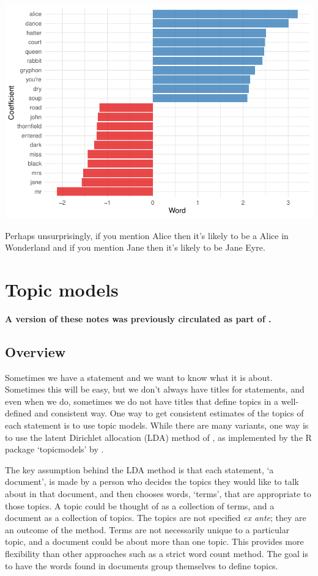 \documentclass[
]{book}
\begin{document}
\includegraphics{telling_stories_with_data_files/figure-latex/unnamed-chunk-412-1.pdf}

Perhaps unsurprisingly, if you mention Alice then it's likely to be a Alice in Wonderland and if you mention Jane then it's likely to be Jane Eyre.

\hypertarget{topic-models}{%
\section{Topic models}\label{topic-models}}

\textbf{A version of these notes was previously circulated as part of \citet{Alexander2020}.}

\hypertarget{overview-1}{%
\subsection{Overview}\label{overview-1}}

Sometimes we have a statement and we want to know what it is about. Sometimes this will be easy, but we don't always have titles for statements, and even when we do, sometimes we do not have titles that define topics in a well-defined and consistent way. One way to get consistent estimates of the topics of each statement is to use topic models. While there are many variants, one way is to use the latent Dirichlet allocation (LDA) method of \citet{Blei2003latent}, as implemented by the R package `topicmodels' by \citet{Grun2011}.

The key assumption behind the LDA method is that each statement, `a document', is made by a person who decides the topics they would like to talk about in that document, and then chooses words, `terms', that are appropriate to those topics. A topic could be thought of as a collection of terms, and a document as a collection of topics. The topics are not specified \emph{ex ante}; they are an outcome of the method. Terms are not necessarily unique to a particular topic, and a document could be about more than one topic. This provides more flexibility than other approaches such as a strict word count method. The goal is to have the words found in documents group themselves to define topics.
\end{document}
